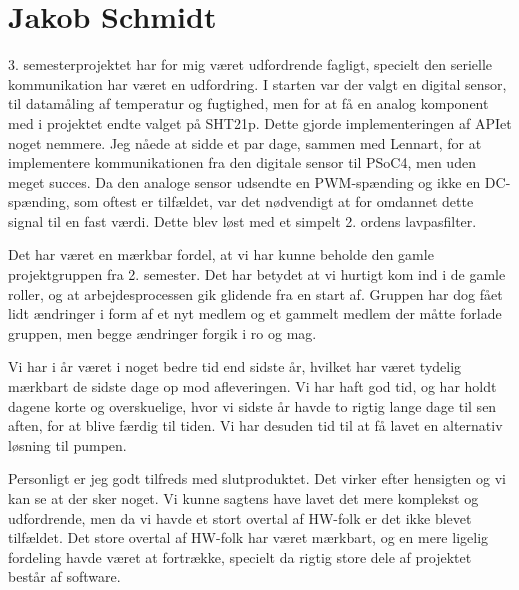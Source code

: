 \section{Jakob Schmidt}

3. semesterprojektet har for mig været udfordrende fagligt, specielt den serielle kommunikation har været en udfordring. I starten var der valgt en digital sensor, til datamåling af temperatur og fugtighed, men for at få en analog komponent med i projektet endte valget på SHT21p. Dette gjorde implementeringen af APIet noget nemmere. Jeg nåede at sidde et par dage, sammen med Lennart, for at implementere kommunikationen fra den digitale sensor til PSoC4, men uden meget succes. 
Da den analoge sensor udsendte en PWM-spænding og ikke en DC-spænding, som oftest er tilfældet, var det nødvendigt at for omdannet dette signal til en fast værdi. Dette blev løst med et simpelt 2. ordens lavpasfilter. 

Det har været en mærkbar fordel, at vi har kunne beholde den gamle projektgruppen fra 2. semester. Det har betydet at vi hurtigt kom ind i de gamle roller, og at arbejdesprocessen gik glidende fra en start af. Gruppen har dog fået lidt ændringer i form af et nyt medlem og et gammelt medlem der måtte forlade gruppen, men begge ændringer forgik i ro og mag.

Vi har i år været i noget bedre tid end sidste år, hvilket har været tydelig mærkbart de sidste dage op mod afleveringen. Vi har haft god tid, og har holdt dagene korte og overskuelige, hvor vi sidste år havde to rigtig lange dage til sen aften, for at blive færdig til tiden. 
Vi har desuden tid til at få lavet en alternativ løsning til pumpen.

Personligt er jeg godt tilfreds med slutproduktet. Det virker efter hensigten og vi kan se at der sker noget. Vi kunne sagtens have lavet det mere komplekst og udfordrende, men da vi havde et stort overtal af HW-folk er det ikke blevet tilfældet. Det store overtal af HW-folk har været mærkbart, og en mere ligelig fordeling havde været at fortrække, specielt da rigtig store dele af projektet består af software. 
